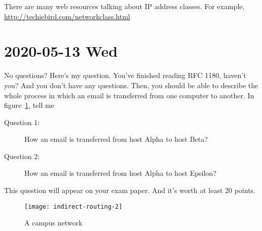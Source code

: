 \documentclass{article}
\begin{document}
There are many web resources talking about IP address classes. For example, 
\url{http://techiebird.com/networkclass.html}

\section{2020-05-13 Wed}
\label{sec:2020-05-13}

No questions? Here's my question. You've finished reading RFC 1180, haven't you? And you
don't have any questions. Then, you should be able to describe the whole process in which
an email is transferred from one computer to another. In figure~\ref{fig:routing}, tell me
\begin{description}
\item[Question 1:] How an email is transferred from host Alpha to host Beta?
\item[Question 2:] How an email is transferred from host Alpha to host Epsilon?
\end{description}

This question will appear on your exam paper. And it's worth at least 20 points.

\begin{figure}
  \centering
  \texttt{[image: indirect-routing-2]}
  \caption{A campus network\label{fig:routing}}  
\end{figure}
\end{document}
